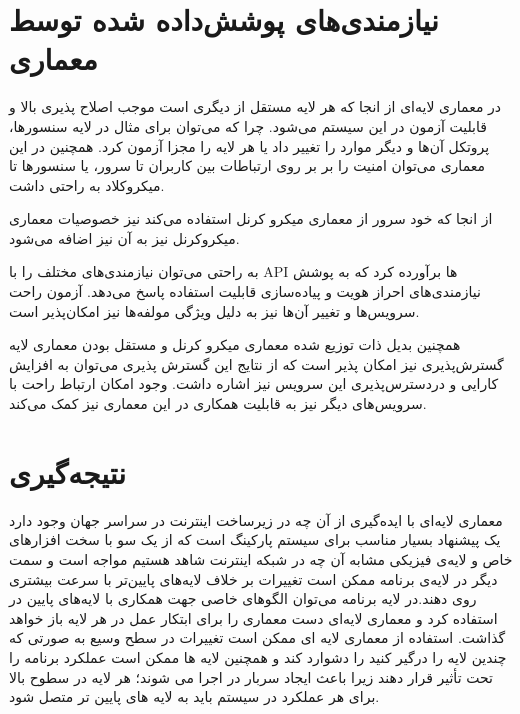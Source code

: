 \section{نیازمندی‌های پوشش‌داده شده توسط معماری}

در معماری لایه‌ای از انجا که هر لایه مستقل از دیگری است موجب اصلاح ‌پذیری بالا و قابلیت آزمون در این سیستم می‌شود. چرا که می‌توان برای مثال  در لایه سنسور‌ها، پروتکل آن‌ها و دیگر موارد را تغییر داد یا هر لایه را مجزا آزمون کرد.
همچنین در این معماری می‌توان امنیت را بر بر روی ارتباطات بین کاربران تا سرور، یا سنسورها تا میکروکلاد به راحتی داشت. 

از انجا که خود سرور از معماری میکرو کرنل استفاده می‌کند نیز خصوصیات معماری میکروکرنل نیز به آن نیز اضافه می‌شود. 

به راحتی می‌توان نیازمندی‌های مختلف را با API ها برآورده کرد که به پوشش نیازمندی‌های احراز هویت و پیاده‌سازی قابلیت استفاده پاسخ می‌دهد. آزمون راحت سرویس‌ها و تغییر آن‌ها نیز به دلیل ویژگی‌  
مولفه‌ها نیز امکان‌پذیر است. 

همچنین بدیل ذات توزیع شده معماری میکرو کرنل و مستقل بودن معماری لایه گسترش‌پذیری نیز امکان پذیر است که از نتایج این گسترش پذیری می‌توان به افزایش کارایی و دردسترس‌پذیری این سرویس نیز اشاره داشت.
وجود امکان ارتباط راحت با سرویس‌های دیگر نیز به قابلیت همکاری در این معماری نیز کمک می‌کند.

\section{نتیجه‌گیری}
معماری لایه‌ای با ایده‌گیری از آن چه در زیرساخت اینترنت در سراسر جهان وجود دارد یک پیشنهاد بسیار مناسب برای سیستم پارکینگ است که از یک سو با سخت افزار‌های خاص و لایه‌ی فیزیکی مشابه آن چه در شبکه اینترنت شاهد هستیم مواجه است و سمت دیگر در لایه‌ی برنامه ممکن است تغییرات بر خلاف لایه‌های پایین‌تر با سرعت بیشتری روی دهند.در لایه برنامه می‌توان الگو‌های خاصی جهت همکاری با لایه‌های پایین در استفاده کرد و معماری لایه‌ای دست معماری را برای ابتکار عمل در هر لایه باز خواهد گذاشت.
استفاده از معماری لایه ای ممکن است تغییرات در سطح وسیع به صورتی که چندین لایه را درگیر کنید را دشوارد کند و همچنین لایه ها ممکن است عملکرد برنامه را تحت تأثیر قرار دهند زیرا باعث ایجاد سربار در اجرا می شوند؛ هر لایه در سطوح بالا برای هر عملکرد در سیستم باید به لایه های پایین تر متصل شود.
